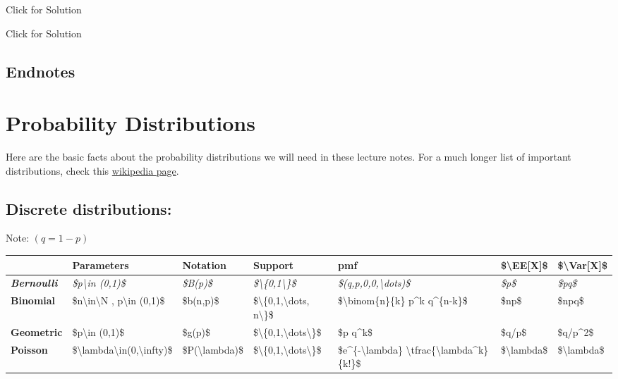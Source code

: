 \documentclass[
]{book}
\theoremstyle{definition}
\theoremstyle{definition}
\theoremstyle{definition}
\theoremstyle{definition}
\theoremstyle{remark}
\begin{document}
Click for Solution

Click for Solution

\hypertarget{endnotes-1}{%
\section{Endnotes}\label{endnotes-1}}

\hypertarget{appendix-appendix}{%
\appendix}


\hypertarget{dist}{%
\chapter{Probability Distributions}\label{dist}}

Here are the basic facts about the probability distributions we will need in these lecture notes. For a much longer list of important distributions, check this \href{https://en.wikipedia.org/wiki/List_of_probability_distributions}{wikipedia page}.

\hypertarget{discrete-distributions}{%
\section{Discrete distributions:}\label{discrete-distributions}}

Note: \((q=1-p)\)

\begin{tabular}{>{}l|l|l|l|l|l|l}
\hline
 & Parameters & Notation & Support & pmf & \$\textbackslash{}EE[X]\$ & \$\textbackslash{}Var[X]\$\\
\hline
\em{\textbf{Bernoulli}} & \em{\$p\textbackslash{}in (0,1)\$} & \em{\$B(p)\$} & \em{\$\textbackslash{}\{0,1\textbackslash{}\}\$} & \em{\$(q,p,0,0,\textbackslash{}dots)\$} & \em{\$p\$} & \em{\$pq\$}\\
\hline
\textbf{Binomial} & \$n\textbackslash{}in\textbackslash{}N , p\textbackslash{}in (0,1)\$ & \$b(n,p)\$ & \$\textbackslash{}\{0,1,\textbackslash{}dots, n\textbackslash{}\}\$ & \$\textbackslash{}binom\{n\}\{k\} p\textasciicircum{}k q\textasciicircum{}\{n-k\}\$ & \$np\$ & \$npq\$\\
\hline
\textbf{Geometric} & \$p\textbackslash{}in (0,1)\$ & \$g(p)\$ & \$\textbackslash{}\{0,1,\textbackslash{}dots\textbackslash{}\}\$ & \$p q\textasciicircum{}k\$ & \$q/p\$ & \$q/p\textasciicircum{}2\$\\
\hline
\textbf{Poisson} & \$\textbackslash{}lambda\textbackslash{}in(0,\textbackslash{}infty)\$ & \$P(\textbackslash{}lambda)\$ & \$\textbackslash{}\{0,1,\textbackslash{}dots\textbackslash{}\}\$ & \$e\textasciicircum{}\{-\textbackslash{}lambda\} \textbackslash{}tfrac\{\textbackslash{}lambda\textasciicircum{}k\}\{k!\}\$ & \$\textbackslash{}lambda\$ & \$\textbackslash{}lambda\$\\
\hline
\end{tabular}
\end{document}
